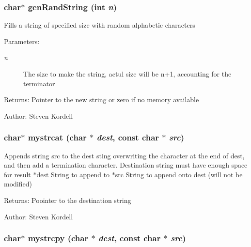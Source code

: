 \subsubsection{\setlength{\rightskip}{0pt plus 5cm}char$\ast$ gen\-Rand\-String (int {\em n})}\label{mystring_8h_6d35dbb5801b4a0118ee8fca9413285a}


Fills a string of specified size with random alphabetic characters \begin{Desc}
\item[Parameters:]
\begin{description}
\item[{\em n}]The size to make the string, actul size will be n+1, accounting for the terminator \end{description}
\end{Desc}
\begin{Desc}
\item[Returns:]Pointer to the new string or zero if no memory available \end{Desc}
\begin{Desc}
\item[Author:]Steven Kordell \end{Desc}
\subsubsection{\setlength{\rightskip}{0pt plus 5cm}char$\ast$ mystrcat (char $\ast$ {\em dest}, const char $\ast$ {\em src})}\label{mystring_8h_2cb0b44ce485a993e756027da5de81f5}


Appends string src to the dest sting overwriting the  character at the end of dest, and then add a termination  character. Destination string must have enough space for result  $\ast$dest String to append to  $\ast$src String to append onto dest (will not be modified) \begin{Desc}
\item[Returns:]Poointer to the destination string \end{Desc}
\begin{Desc}
\item[Author:]Steven Kordell \end{Desc}
\subsubsection{\setlength{\rightskip}{0pt plus 5cm}char$\ast$ mystrcpy (char $\ast$ {\em dest}, const char $\ast$ {\em src})}\label{mystring_8h_904b16ff21c3142202e139a3ac79e19a}



